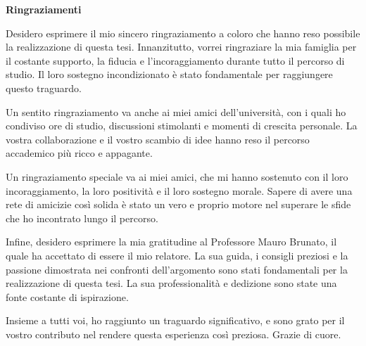 \thispagestyle{empty}

\begin{center}
  {\bf \Huge Ringraziamenti}
\end{center}

\vspace{4cm}
Desidero esprimere il mio sincero ringraziamento a coloro che hanno reso
possibile la realizzazione di questa tesi. Innanzitutto, vorrei ringraziare la
mia famiglia per il costante supporto, la fiducia e l'incoraggiamento durante
tutto il percorso di studio. Il loro sostegno incondizionato è stato
fondamentale per raggiungere questo traguardo.

Un sentito ringraziamento va anche ai miei amici dell'università, con i quali
ho condiviso ore di studio, discussioni stimolanti e momenti di crescita
personale. La vostra collaborazione e il vostro scambio di idee hanno reso il
percorso accademico più ricco e appagante.

Un ringraziamento speciale va ai miei amici, che mi hanno sostenuto con il loro
incoraggiamento, la loro positività e il loro sostegno morale. Sapere di avere
una rete di amicizie così solida è stato un vero e proprio motore nel superare
le sfide che ho incontrato lungo il percorso.

Infine, desidero esprimere la mia gratitudine al Professore Mauro Brunato,  il
quale ha accettato di essere il mio relatore. La sua guida, i consigli preziosi
e la passione dimostrata nei confronti dell'argomento sono stati fondamentali
per la realizzazione di questa tesi. La sua professionalità e dedizione sono
state una fonte costante di ispirazione.

Insieme a tutti voi, ho raggiunto un traguardo significativo, e sono grato per
il vostro contributo nel rendere questa esperienza così preziosa. Grazie di
cuore.

